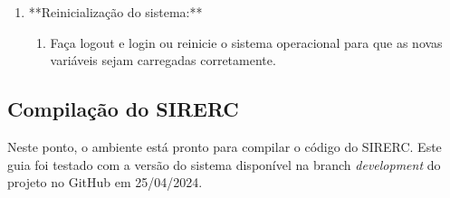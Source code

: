 \documentclass[a4paper,11pt]{article}
\newcommand{\sistema}{\textsf{SIRERC}}
\begin{document}
\begin{enumerate}
	\item **Reinicialização do sistema:**
	\begin{enumerate}
		\item Faça logout e login ou reinicie o sistema operacional para que as novas variáveis sejam carregadas corretamente.
	\end{enumerate}
\end{enumerate}
\subsection{Compilação do \sistema{}}

Neste ponto, o ambiente está pronto para compilar o código do \sistema{}. Este guia foi testado com a versão do sistema disponível na branch \emph{development} do projeto no GitHub em 25/04/2024.
\end{document}
